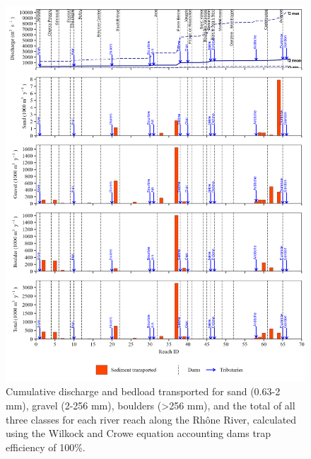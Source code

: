 \documentclass[
]{book}
\begin{document}
\begin{figure}
\includegraphics[width=26.24in]{img/res_cascade/res_E3_eW&C/plots_transp-silt/transp_res_sum_hy_E3_eW&C} \caption{Cumulative discharge and bedload transported for sand (0.63-2 mm), gravel (2-256 mm), boulders (>256 mm), and the total of all three classes for each river reach along the Rhône River, calculated using the Wilkock and Crowe equation accounting dams trap efficiency of 100\%.}\label{fig:TrE3eW}
\end{figure}
\end{document}
